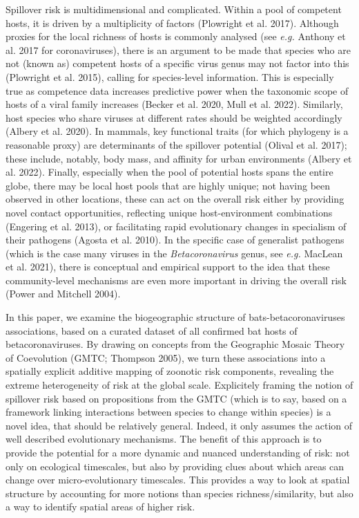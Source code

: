 \documentclass[11pt]{article}
\begin{document}
\vfill

\clearpage
\linenumbers
\pagestyle{normal}

Spillover risk is multidimensional and complicated. Within a pool of
competent hosts, it is driven by a multiplicity of factors (Plowright et
al. 2017). Although proxies for the local richness of hosts is commonly
analysed (see \emph{e.g.} Anthony et al. 2017 for coronaviruses), there
is an argument to be made that species who are not (known as) competent
hosts of a specific virus genus may not factor into this (Plowright et
al. 2015), calling for species-level information. This is especially
true as competence data increases predictive power when the taxonomic
scope of hosts of a viral family increases (Becker et al. 2020, Mull et
al. 2022). Similarly, host species who share viruses at different rates
should be weighted accordingly (Albery et al. 2020). In mammals, key
functional traits (for which phylogeny is a reasonable proxy) are
determinants of the spillover potential (Olival et al. 2017); these
include, notably, body mass, and affinity for urban environments (Albery
et al. 2022). Finally, especially when the pool of potential hosts spans
the entire globe, there may be local host pools that are highly unique;
not having been observed in other locations, these can act on the
overall risk either by providing novel contact opportunities, reflecting
unique host-environment combinations (Engering et al. 2013), or
facilitating rapid evolutionary changes in specialism of their pathogens
(Agosta et al. 2010). In the specific case of generalist pathogens
(which is the case many viruses in the \emph{Betacoronavirus} genus, see
\emph{e.g.} MacLean et al. 2021), there is conceptual and empirical
support to the idea that these community-level mechanisms are even more
important in driving the overall risk (Power and Mitchell 2004).

In this paper, we examine the biogeographic structure of
bats-betacoronaviruses associations, based on a curated dataset of all
confirmed bat hosts of betacoronaviruses. By drawing on concepts from
the Geographic Mosaic Theory of Coevolution (GMTC; Thompson 2005), we
turn these associations into a spatially explicit additive mapping of
zoonotic risk components, revealing the extreme heterogeneity of risk at
the global scale. Explicitely framing the notion of spillover risk based
on propositions from the GMTC (which is to say, based on a framework
linking interactions between species to change within species) is a
novel idea, that should be relatively general. Indeed, it only assumes
the action of well described evolutionary mechanisms. The benefit of
this approach is to provide the potential for a more dynamic and nuanced
understanding of risk: not only on ecological timescales, but also by
providing clues about which areas can change over micro-evolutionary
timescales. This provides a way to look at spatial structure by
accounting for more notions than species richness/similarity, but also a
way to identify spatial areas of higher risk.
\end{document}
